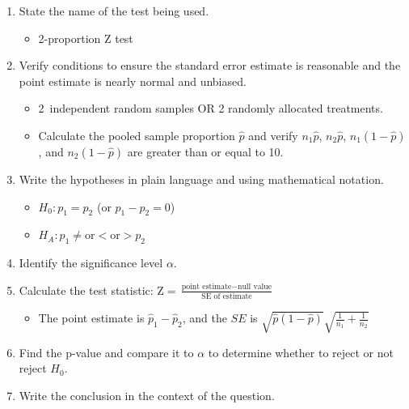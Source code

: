 \begin{termBox}{
\begin{enumerate}
\setlength{\itemsep}{0mm}
\item State the name of the test being used.
\vspace{-1.5mm}
\begin{itemize}
\item 2-proportion Z test
\end{itemize}
\item Verify conditions to ensure the standard error estimate is reasonable and the point estimate is nearly normal and unbiased.\vspace{-1.5mm}
  \begin{itemize}
  \setlength{\itemsep}{0mm}
  \item 2~independent random samples OR 2 randomly allocated treatments. 
  \item Calculate the pooled sample proportion $\hat{p}$ and verify $n_1\hat{p}$, $n_2\hat{p}$, $n_1(1 - \hat{p})$, and $n_2(1 - \hat{p})$ are greater than or equal to 10.
  \end{itemize}
\item Write the hypotheses in plain language and using mathematical notation.\vspace{-1.5mm}
  \begin{itemize}
  \setlength{\itemsep}{0mm}
  \item $H_0: p_1 = p_2$ (or $p_1 - p_2 = 0$)
  \item $H_A: p_1 \ne \text{or} < \text{or} > p_2$
  \end{itemize}
\item Identify the significance level $\alpha$.
\item Calculate the test statistic: $\text{Z} = \frac{\text{point estimate} - \text{null value}}{\text{SE of estimate}}$
  \begin{itemize}
  \item The point estimate is $\hat{p}_1 - \hat{p}_2$, and the $SE$ is $\sqrt{\hat{p}(1-\hat{p})}\sqrt{\frac{1}{n_1} + \frac{1}{n_2}}$
  \end{itemize}
\item Find the p-value and compare it to $\alpha$ to determine whether to reject or not reject $H_0$.
\item Write the conclusion in the context of the question.
\end{enumerate}}
\end{termBox}

